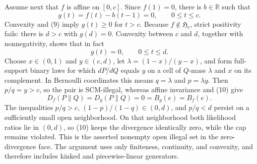 Assume next that \(f\) is affine on \([0,c]\).  Since \(f(1)=0\), there is \(b\in\mathbb R\) such that
\[
 g(t)=f(t)-b(t-1)=0,\qquad 0\le t\le c. \tag{9}
\]
Convexity and (9) imply \(g(t)\ge0\) for \(t>c\).  Because \(f\notin\mathfrak H_c\), strict positivity fails: there is \(d>c\) with \(g(d)=0\).  Convexity between \(c\) and \(d\), together with nonnegativity, shows that in fact
\[
 g(t)=0,\qquad 0\le t\le d. \tag{10}
\]
Choose \(x\in(0,1)\) and \(y\in(c,d)\), let \(\lambda=(1-x)/(y-x)\), and form full-support binary laws for which \(dP/dQ\) equals \(y\) on a cell of \(Q\)-mass \(\lambda\) and \(x\) on its complement.  In Bernoulli coordinates this means \(q=\lambda\) and \(p=\lambda y\).  Then \(p/q=y>c\), so the pair is SCM-illegal, whereas affine invariance and (10) give
\[
 D_f(P\|Q)=D_g(P\|Q)=0=B_g(e)=B_f(e).
\]
The inequalities \(p/q>c\), \((1-p)/(1-q)\in(0,d)\), and \(p/q<d\) persist on a sufficiently small open neighborhood.  On that neighborhood both likelihood ratios lie in \((0,d)\), so (10) keeps the divergence identically zero, while the cap remains violated.  This is the asserted nonempty open illegal set in the zero-divergence face.  The argument uses only finiteness, continuity, and convexity, and therefore includes kinked and piecewise-linear generators.